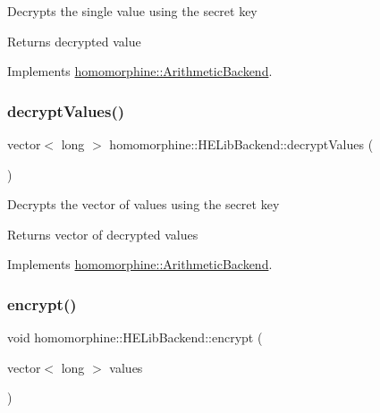 Decrypts the single value using the secret key

\begin{DoxyReturn}{Returns}
decrypted value 
\end{DoxyReturn}


Implements \mbox{\hyperlink{classhomomorphine_1_1_arithmetic_backend_af4aad032c46ce51e608092ac206882bd}{homomorphine\+::\+Arithmetic\+Backend}}.

\mbox{\label{classhomomorphine_1_1_h_e_lib_backend_a650d87bee6056a404f8ab81ec0f84980}} 
\subsubsection{\texorpdfstring{decryptValues()}{decryptValues()}}
{\footnotesize\ttfamily vector$<$ long $>$ homomorphine\+::\+H\+E\+Lib\+Backend\+::decrypt\+Values (\begin{DoxyParamCaption}{ }\end{DoxyParamCaption})\hspace{0.3cm}{\ttfamily [virtual]}}

Decrypts the vector of values using the secret key

\begin{DoxyReturn}{Returns}
vector of decrypted values 
\end{DoxyReturn}


Implements \mbox{\hyperlink{classhomomorphine_1_1_arithmetic_backend_a2fb1ce64e74c4930b7d364ce3b9cc8fe}{homomorphine\+::\+Arithmetic\+Backend}}.

\mbox{\label{classhomomorphine_1_1_h_e_lib_backend_ae142417734796968fe66c4b6174d2b8a}} 
\subsubsection{\texorpdfstring{encrypt()}{encrypt()}\hspace{0.1cm}{\footnotesize\ttfamily [1/2]}}
{\footnotesize\ttfamily void homomorphine\+::\+H\+E\+Lib\+Backend\+::encrypt (\begin{DoxyParamCaption}\item[{vector$<$ long $>$}]{values }\end{DoxyParamCaption})\hspace{0.3cm}{\ttfamily [virtual]}}

